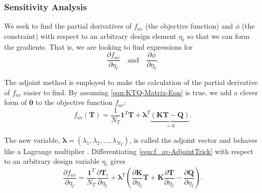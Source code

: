 \subsubsection*{Sensitivity Analysis}

We seek to find the partial derivatives of $f_{av}$ (the objective function) and $\phi$ (the constraint) with respect to an arbitrary design element $\eta_{\ell}$ so that we can form the gradients. That is, we are looking to find expressions for $$\displaystyle\frac{\partial f_{av}}{\partial\eta_\ell}\quad\text{and}\quad\displaystyle\frac{\partial\phi}{\partial\eta_\ell}.$$

The adjoint method is employed to make the calculation of the partial derivative of $f_{av}$ easier to find. By assuming \eqref{eqn:KTQ-Matrix-Eqn} is true, we add a clever form of $\mathbf{0}$ to the objective function $f_{av}$:
\begin{equation}
	f_{av}\left(\mathbf{T}\right)=\frac{1}{N_T}\mathbf{1}^T\mathbf{T}+\boldsymbol{\lambda}^T\underbrace{\left(\mathbf{K}\mathbf{T}-\mathbf{Q}\right)}_{=0}.\label{eqn:f_av-AdjointTrick}
\end{equation}

The new variable, $\boldsymbol{\lambda}=\left(\lambda_1,\lambda_2,\ldots,\lambda_{N_T}\right)$, is called the adjoint vector and behaves like a Lagrange multiplier \cite{Johnson2021}. Differentiating \eqref{eqn:f_av-AdjointTrick} with respect to an arbitrary design variable $\eta_\ell$ gives
\begin{equation}
	\frac{\partial f_{av}}{\partial\eta_{\ell}}=\frac{\mathbf{1}^T}{N_T}\frac{\partial\mathbf{T}_i}{\partial\eta_{\ell}}+\boldsymbol{\lambda}^T\left(\frac{\partial\mathbf{K}}{\partial\eta_{\ell}}\mathbf{T}+\mathbf{K}\frac{\partial\mathbf{T}}{\partial\eta_{\ell}}-\frac{\partial\mathbf{Q}}{\partial\eta_{\ell}}\right).\label{df_av/deta}
\end{equation}

